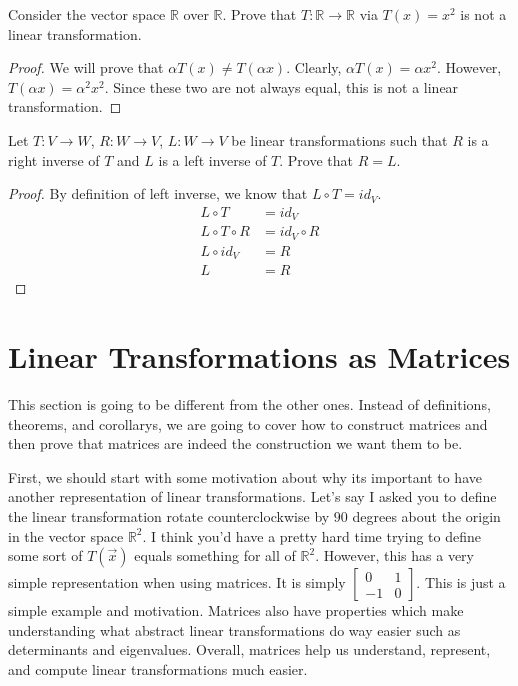 \begin{exercise}
    Consider the vector space $\mathbb{R}$ over $\mathbb{R}$. Prove that $T:\mathbb{R}\to \mathbb{R}$ via $T(x)=x^2$ is not a linear transformation.
\end{exercise}
\begin{proof}
    We will prove that $\alpha T(x)\neq T(\alpha x)$. Clearly, $\alpha T(x)=\alpha x^2$. However, $T(\alpha x)=\alpha^2x^2$. Since these two are not always equal, this is not a linear transformation.
\end{proof}
\begin{exercise}
    Let $T:V\to W$, $R: W\to V$, $L: W\to V$ be linear transformations such that $R$ is a right inverse of $T$ and $L$ is a left inverse of $T$. Prove that $R=L$.
\end{exercise}
\begin{proof}
    By definition of left inverse, we know that $L\circ T=id_V$.
    \begin{align*}
        L\circ T&=id_V\\
        L\circ T\circ R&=id_V\circ R\\
        L\circ id_V&=R\\
        L&=R
    \end{align*}
\end{proof}
\section{Linear Transformations as Matrices}
This section is going to be different from the other ones. Instead of definitions, theorems, and corollarys, we are going to cover how to construct matrices and then prove that matrices are indeed the construction we want them to be. 

First, we should start with some motivation about why its important to have another representation of linear transformations. Let's say I asked you to define the linear transformation rotate counterclockwise by $90$ degrees about the origin in the vector space $\mathbb{R}^2$. I think you'd have a pretty hard time trying to define some sort of $T(\vec{x})$ equals something for all of $\mathbb{R}^2$. However, this has a very simple representation when using matrices. It is simply $\left[\begin{smallmatrix}
    0 & 1 \\ -1 & 0
\end{smallmatrix}\right]$. This is just a simple example and motivation. Matrices also have properties which make understanding what abstract linear transformations do way easier such as determinants and eigenvalues. Overall, matrices help us understand, represent, and compute linear transformations much easier.

